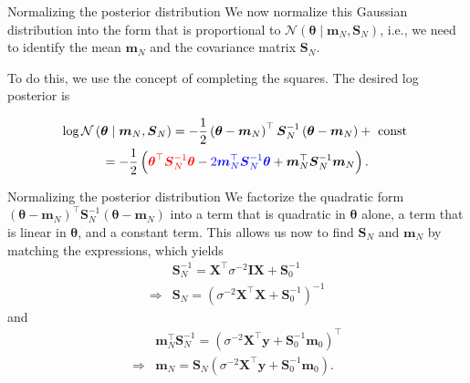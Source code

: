 \documentclass{beamer}
\begin{document}
\begin{frame}{Normalizing the posterior distribution}
We now normalize this Gaussian distribution into the form that is proportional to $\mathcal{N}\left(\boldsymbol{\theta} \mid \boldsymbol{m}_N, \boldsymbol{S}_N\right)$, i.e., we need to identify the mean $\boldsymbol{m}_N$ and the covariance matrix $\boldsymbol{S}_N$. 

\pause To do this, we use the concept of completing the squares. The desired log posterior is

\pause $$
\begin{gathered}
\log \mathcal{N}\left(\boldsymbol{\theta} \mid \boldsymbol{m}_N, \boldsymbol{S}_N\right)=-\frac{1}{2}\left(\boldsymbol{\theta}-\boldsymbol{m}_N\right)^{\top} \boldsymbol{S}_N^{-1}\left(\boldsymbol{\theta}-\boldsymbol{m}_N\right)+\text { const } \\
=-\frac{1}{2}\left(\textcolor{red}{\boldsymbol{\theta}^{\top} \boldsymbol{S}_N^{-1} \boldsymbol{\theta}}-\textcolor{blue}{2 \boldsymbol{m}_N^{\top} \boldsymbol{S}_N^{-1} \boldsymbol{\theta}}+\boldsymbol{m}_N^{\top} \boldsymbol{S}_N^{-1} \boldsymbol{m}_N\right) .
\end{gathered}
$$
\end{frame}

\begin{frame}{Normalizing the posterior distribution}
We factorize the quadratic form $\left(\boldsymbol{\theta}-\boldsymbol{m}_N\right)^{\top} \boldsymbol{S}_N^{-1}\left(\boldsymbol{\theta}-\boldsymbol{m}_N\right)$ into a term that is quadratic in $\boldsymbol{\theta}$ alone, a term that is linear in $\boldsymbol{\theta}$, and a constant term. This allows us now to find $\boldsymbol{S}_N$ and $\boldsymbol{m}_N$ by matching the expressions, which yields
$$
\begin{aligned}
& \boldsymbol{S}_N^{-1}=\boldsymbol{X}^{\top} \sigma^{-2} \boldsymbol{I} \boldsymbol{X}+\boldsymbol{S}_0^{-1} \\
\Longrightarrow & \boldsymbol{S}_N=\left(\sigma^{-2} \boldsymbol{X}^{\top} \boldsymbol{X}+\boldsymbol{S}_0^{-1}\right)^{-1}
\end{aligned}
$$
and
$$
\begin{aligned}
& \boldsymbol{m}_N^{\top} \boldsymbol{S}_N^{-1}=\left(\sigma^{-2} \boldsymbol{X}^{\top} \boldsymbol{y}+\boldsymbol{S}_0^{-1} \boldsymbol{m}_0\right)^{\top} \\
\Longrightarrow & \boldsymbol{m}_N=\boldsymbol{S}_N\left(\sigma^{-2} \boldsymbol{X}^{\top} \boldsymbol{y}+\boldsymbol{S}_0^{-1} \boldsymbol{m}_0\right) .
\end{aligned}
$$
\end{frame}
\end{document}
